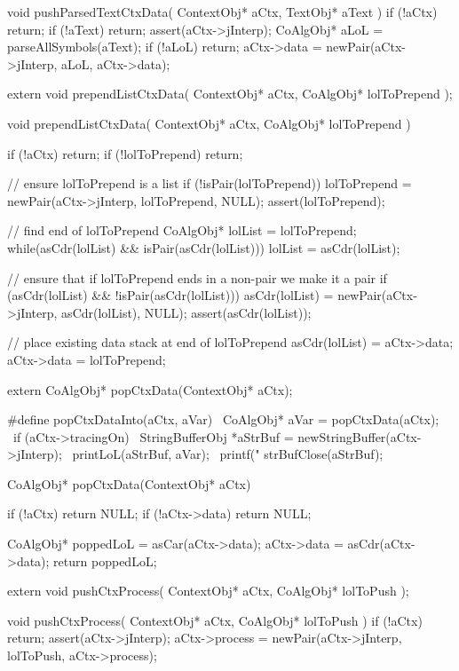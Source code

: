 \startCCode
void pushParsedTextCtxData(
  ContextObj* aCtx,
  TextObj* aText
) {
  if (!aCtx) return;
  if (!aText) return;
  assert(aCtx->jInterp);
  CoAlgObj* aLoL = parseAllSymbols(aText);
  if (!aLoL) return;
  aCtx->data = newPair(aCtx->jInterp, aLoL, aCtx->data);
}
\stopCCode

\startCHeader
extern void prependListCtxData(
  ContextObj* aCtx,
  CoAlgObj* lolToPrepend
);
\stopCHeader

\startCCode
void prependListCtxData(
  ContextObj* aCtx,
  CoAlgObj* lolToPrepend
) {
  if (!aCtx) return;
  if (!lolToPrepend) return;

  // ensure lolToPrepend is a list
  if (!isPair(lolToPrepend)) {
    lolToPrepend = newPair(aCtx->jInterp, lolToPrepend, NULL);
    assert(lolToPrepend);
  }

  // find end of lolToPrepend
  CoAlgObj* lolList = lolToPrepend;
  while(asCdr(lolList) && isPair(asCdr(lolList))) {
    lolList = asCdr(lolList);
  }

  // ensure that if lolToPrepend ends in a non-pair we make it a pair
  if (asCdr(lolList) && !isPair(asCdr(lolList))) {
    asCdr(lolList) = newPair(aCtx->jInterp, asCdr(lolList), NULL);
    assert(asCdr(lolList));
  }

  // place existing data stack at end of lolToPrepend
  asCdr(lolList) = aCtx->data;
  aCtx->data     = lolToPrepend;
}
\stopCCode

\startCHeader
extern CoAlgObj* popCtxData(ContextObj* aCtx);

#define popCtxDataInto(aCtx, aVar)                            \
CoAlgObj* aVar = popCtxData(aCtx);                            \
if (aCtx->tracingOn) {                                        \
  StringBufferObj *aStrBuf = newStringBuffer(aCtx->jInterp);  \
  printLoL(aStrBuf, aVar);                                    \
  printf("%
  strBufClose(aStrBuf);                                       \
}
\stopCHeader

\startCCode
CoAlgObj* popCtxData(ContextObj* aCtx) {
  if (!aCtx) return NULL;
  if (!aCtx->data) return NULL;

  CoAlgObj* poppedLoL = asCar(aCtx->data);
  aCtx->data          = asCdr(aCtx->data);
  return poppedLoL;
}
\stopCCode

\startCHeader
extern void pushCtxProcess(
  ContextObj* aCtx,
  CoAlgObj* lolToPush
);
\stopCHeader

\startCCode
void pushCtxProcess(
  ContextObj* aCtx,
  CoAlgObj* lolToPush
) {
  if (!aCtx) return;
  assert(aCtx->jInterp);
  aCtx->process = newPair(aCtx->jInterp, lolToPush, aCtx->process);
}
\stopCCode

